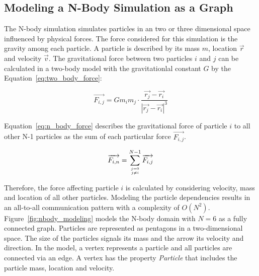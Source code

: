 \subsection{Modeling a N-Body Simulation as a Graph}
\label{sec:design:nbody}


The N-body simulation simulates particles in an two or three
dimensional space influenced by physical forces. The force considered
for this simulation is the gravity among each particle.  A particle is
described by its mass $m$, location $\overrightarrow{r}$ and velocity
$\overrightarrow{v}$.  The gravitational force between two particles
$i$ and $j$ can be calculated in a two-body model with the
gravitationlal constant $G$ by the Equation~\ref{eq:two_body_force}:

\begin{equation}
  \label{eq:two_body_force}
  \overrightarrow{F_{i,j}} = G  m_i  m_j \cdot \frac{\overrightarrow{r_j} - \overrightarrow{r_i}}{|\overrightarrow{r_j} - \overrightarrow{r_i}|^3}
\end{equation}

\noindent Equation~\ref{eq:n_body_force} describes the gravitational force of
particle $i$ to all other N-1 particles as the sum of each particular
force $\overrightarrow{F_{i,j}}$.

\begin{equation}
  \label{eq:n_body_force}
  \overrightarrow{F_{i,n}} = \sum_{j = 0 \atop j \neq i}^{N-1} \overrightarrow{F_{i,j}}
\end{equation}

\noindent Therefore, the force affecting particle $i$ is calculated by
considering velocity, mass and location of all other
particles. Modeling the particle dependencies results in an all-to-all
communication pattern with a complexity of
$O(N^2)$. Figure~\ref{fig:nbody_modeling} models the N-body domain
with $N = 6$ as a fully connected graph. Particles are represented as
pentagons in a two-dimensional space. The size of the particles
signals its mass and the arrow its velocity and direction.  In the
model, a vertex represents a particle and all particles are connected
via an edge. A vertex has the property \emph{Particle} that includes
the particle mass, location and velocity.

